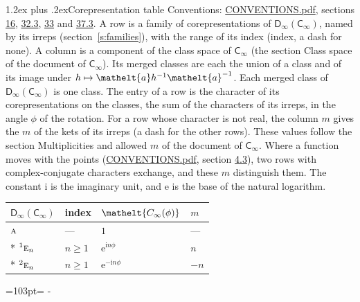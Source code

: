 \documentclass[10pt,a4paper]{article}
\makeatletter
\renewcommand\section{\@startsection{section}{1}{\z@}{-3ex plus -1ex minus -.2ex}%
  {1.2ex plus .2ex}{\normalfont\large\sffamily\bfseries\color{parttitle}}}
\newcommand{\needspace}[1]{\par\penalty-100\begingroup\dimen0=#1\relax\dimen2=\pagegoal
  \advance\dimen2-\pagetotal\ifdim\dimen0>\dimen2\relax\ifdim\dimen2>0pt\vfil\break\fi\fi
  \endgroup}
\numberwithin{equation}{section}
\newcommand{\eltfont}[1]{{\let\sigma\eltsigma\mathelt{#1}}}
\newcommand{\grp}[1]{\mathsf{#1}}
\newcommand{\irr}[1]{\text{\normalfont\scshape #1}}
\newcommand{\conjpair}[1]{{}^{#1}}
\newcommand{\comp}[1]{\eltfont{#1}}
\newcommand{\elt}[1]{\eltfont{#1}}
\newcommand{\iunit}{\mathrm{i}}
\newcommand{\expe}{\mathrm{e}}
\makeatother
\begin{document}
\section{Corepresentation table}\label{s:character_table}
Conventions: \href{../../CONVENTIONS.pdf}{CONVENTIONS.pdf}, sections \href{../../../rotation/CONVENTIONS.pdf\#conv.16}{16}, \href{../../CONVENTIONS.pdf\#conv.32.3}{32.3}, \href{../../CONVENTIONS.pdf\#conv.33}{33} and \href{../../CONVENTIONS.pdf\#conv.37.3}{37.3}.
A row is a family of corepresentations of $\grp{D_{\infty}}(\grp{C_{\infty}})$, named by its irreps (section~\ref{s:families}), with the range of its index (index, a dash for none). A column is a component of the class space of $\grp{C_{\infty}}$ (the section Class space of the document of \href{../../../rotation/data/pdf/Cinf.pdf}{$\grp{C_{\infty}}$}). Its merged classes are each the union of a class and of its image under $h \mapsto \elt{a} h^{-1} \elt{a}^{-1}$. Each merged class of $\grp{D_{\infty}}(\grp{C_{\infty}})$ is one class. The entry of a row is the character of its corepresentations on the classes, the sum of the characters of its irreps, in the angle $\phi$ of the rotation. For a row whose character is not real, the column $m$ gives the $m$ of the kets of its irreps (a dash for the other rows). These values follow the section Multiplicities and allowed $m$ of the document of \href{../../../rotation/data/pdf/Cinf.pdf}{$\grp{C_{\infty}}$}. Where a function moves with the points (\href{../../CONVENTIONS.pdf}{CONVENTIONS.pdf}, section \href{../../../rotation/CONVENTIONS.pdf\#conv.4.3}{4.3}), two rows with complex-conjugate characters exchange, and these $m$ distinguish them.
The constant $\iunit$ is the imaginary unit, and $\expe$ is the base of the natural logarithm.
{\small\begin{longtable}{@{}llll@{}}\toprule
$\grp{D_{\infty}}(\grp{C_{\infty}})$ & index & $\comp{C_{\infty}(\phi)}$ & $m$\\\midrule\endhead
\bottomrule\endfoot\endlastfoot
$\irr{a}$ & --- & $1$ & ---\\*
$\conjpair{1}\irr{e}_{n}$ & $n \ge 1$ & $\expe^{\iunit n\phi}$ & $n$\\*
$\conjpair{2}\irr{e}_{n}$ & $n \ge 1$ & $\expe^{-\iunit n\phi}$ & $-n$\\
\bottomrule\end{longtable}}
\needspace{103pt}
\end{document}
